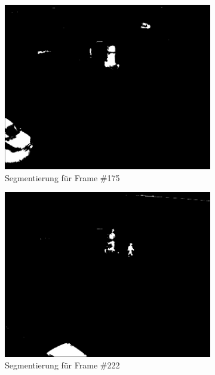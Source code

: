 \documentclass[]{scrartcl}
\begin{document}
\begin{figure}[h!]
\centering
\begin{subfigure}{.5\textwidth}
  \centering
  \includegraphics[width=.9\linewidth]{Seg_S36-A319-8_0175.jpeg}
  \caption{Segmentierung f\"ur Frame \#175}
  \label{fig:seg1}
\end{subfigure}%
\begin{subfigure}{.5\textwidth}
  \centering
  \includegraphics[width=.9\linewidth]{Seg_S36-A319-8_0222.jpeg}
  \caption{Segmentierung f\"ur Frame \#222}
  \label{fig:seg2}
\end{subfigure}
\begin{subfigure}{.5\textwidth}
  \centering

\end{subfigure}
\end{figure}
\end{document}
